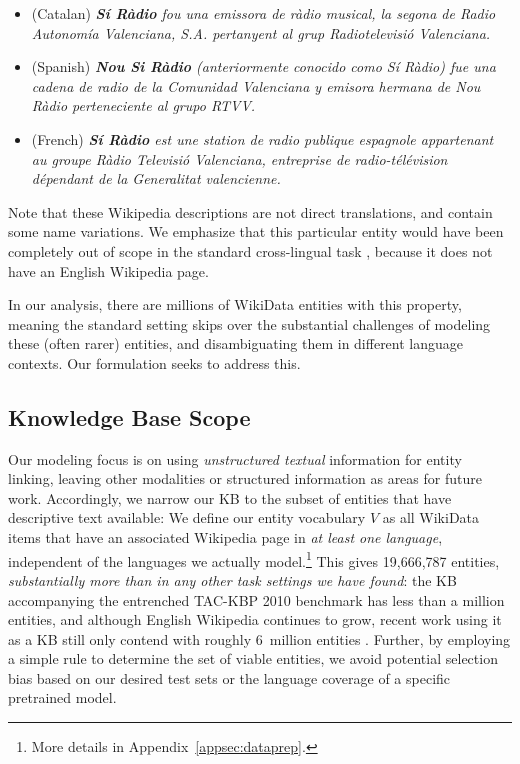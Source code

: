 \documentclass[11pt,a4paper]{article}
\begin{document}
\begin{itemize}
 \item (Catalan) \emph{\textbf{Sí Ràdio} fou una emissora de ràdio musical, la segona de Radio Autonomía Valenciana, S.A. pertanyent al grup Radiotelevisió Valenciana.}
 \item (Spanish) \emph{\textbf{Nou Si Ràdio} (anteriormente conocido como Sí Ràdio) fue una cadena de radio de la Comunidad Valenciana y emisora hermana de Nou Ràdio perteneciente al grupo RTVV.}
 \item (French) \emph{\textbf{Sí Ràdio} est une station de radio publique espagnole appartenant au groupe Ràdio Televisió Valenciana, entreprise de radio-télévision dépendant de la Generalitat valencienne.}
\end{itemize}

Note that these Wikipedia descriptions are not direct translations, and contain some name variations.
We emphasize that this particular entity would have been completely out of scope in the standard cross-lingual task \citep{tsai-roth-2016-cross}, because it does not have an English Wikipedia page.

In our analysis, there are millions of WikiData entities with this property, meaning the standard setting skips over the substantial challenges of modeling these (often rarer) entities, and disambiguating them in different language contexts.
Our formulation seeks to address this.

\subsection{Knowledge Base Scope}
Our modeling focus is on using \emph{unstructured textual} information for entity linking,
leaving other modalities or structured information as areas for future work.
Accordingly, we narrow our KB to the subset of entities that have descriptive text available:
We define our entity vocabulary $V$ as all WikiData items that have an associated Wikipedia page in \emph{at least one language}, independent of the languages we actually model.\footnote{More details in Appendix~\ref{appsec:dataprep}.}
This gives 19,666,787 entities,
\emph{substantially more than in any other task settings we have found}: the KB accompanying the entrenched TAC-KBP 2010 benchmark \citep{ji2010overview} has less than a million entities, and although English Wikipedia continues to grow, recent work using it as a KB still only contend with roughly 6~million entities \citep{fevry2020empirical,zhou_tacl2020}.
Further, by employing a simple rule to determine the set of viable entities, we avoid potential selection bias based on our desired test sets or the language coverage of a specific pretrained model.
\end{document}
